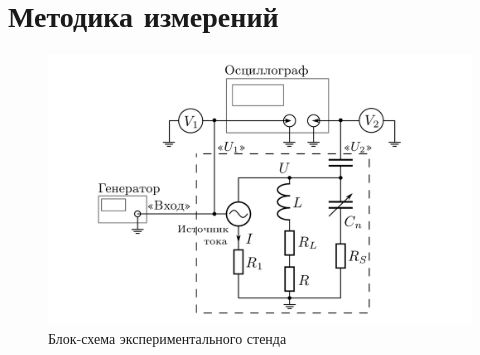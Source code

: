 \documentclass[a4paper, 12pt]{article}
\begin{document}
\section{Методика измерений}

\begin{figure}[h!]
\begin{center}
    \includegraphics[scale=2.5]{ust.png}
\end{center}
\caption{Блок-схема экспериментального стенда}
\label{ust}
\end{figure}
\end{document}
